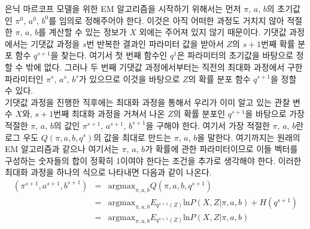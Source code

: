 \documentclass[a4paper]{oblivoir}
\begin{document}
은닉 마르코프 모델을 위한 EM 알고리즘을 시작하기 위해서는 먼저 $\pi$, $a$, $b$의 초기값인 $\pi^{0}$, $a^{0}$, $b^{0}$를 임의로 정해주어야 한다. 이것은 아직 어떠한 과정도 거치지 않아 적절한 $\pi$, $a$, $b$를 계산할 수 있는 정보가 $X$ 외에는 주어져 있지 않기 때문이다. 기댓값 과정에서는 기댓값 과정을 $s$번 반복한 결과인 파라미터 값을 받아서 $Z$의 $s+1$번째 확률 분포 함수 $q^{s+1}$을 찾는다. 여기서 첫 번째 함수인 $q^1$은 파라미터의 초기값을 바탕으로 정할 수 밖에 없다. 그러나 두 번째 기댓값 과정에서부터는 직전의 최대화 과정에서 구한 파라미터인 $\pi^{s}$, $a^{s}$, $b^{s}$가 있으므로 이것을 바탕으로 $Z$의 확률 분포 함수 $q^{s+1}$을 정할 수 있다.  \\

기댓값 과정을 진행한 직후에는 최대화 과정을 통해서 우리가 이미 알고 있는 관찰 변수 $X$와, $s+1$번째 최대화 과정을 거쳐서 나온 $Z$의 확률 분포인 $q^{s+1}$을 바탕으로 가장 적절한 $\pi$, $a$, $b$의 값인 $\pi^{s+1}$, $a^{s+1}$, $b^{s+1}$을 구해야 한다. 여기서 가장 적절한 $\pi$, $a$, $b$란 로그 우도 $Q(\pi, a, b, q^{s})$의 값을 최대로 만드는 $\pi$, $a$, $b$을 말한다. 여기까지는 원래의 EM 알고리즘과 같으나 여기서는 $\pi$, $a$, $b$가 확률에 관한 파라미터이므로 이들 벡터를 구성하는 숫자들의 합이 정확히 1이여야 한다는 조건을 추가로 생각해야 한다. 이러한 최대화 과정을 하나의 식으로 나타내면 다음과 같이 나온다.
\begin{eqnarray}
(\pi^{s+1}, a^{s+1}, b^{s+1}) & = & \textrm{argmax}_{\pi, a, b} Q(\pi, a, b, q^{s+1}) \nonumber \\
& = & \textrm{argmax}_{\pi, a, b} E_{q^{s+1}(Z)} \textrm{ln} P(X, Z|\pi, a, b) + H(q^{s+1}) \nonumber \\ 
& = & \textrm{argmax}_{\pi, a, b} E_{q^{s+1}(Z)} \textrm{ln} P(X, Z|\pi, a, b) \label{eq:9-34}
\end{eqnarray}
\end{document}

